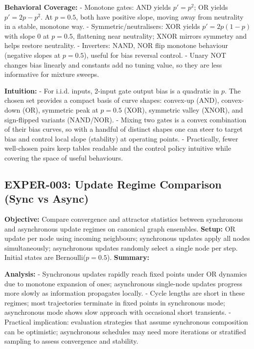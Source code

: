 \textbf{Behavioral Coverage:}
- Monotone gates: AND yields $p' = p^2$; OR yields $p' = 2p - p^2$. At $p=0.5$, both have positive slope, moving away from neutrality in a stable, monotone way.
- Symmetric/neutralisers: XOR yields $p' = 2p(1-p)$ with slope $0$ at $p=0.5$, flattening near neutrality; XNOR mirrors symmetry and helps restore neutrality.
- Inverters: NAND, NOR flip monotone behaviour (negative slopes at $p=0.5$), useful for bias reversal control.
- Unary NOT changes bias linearly and constants add no tuning value, so they are less informative for mixture sweeps.

\textbf{Intuition:}
- For i.i.d. inputs, 2-input gate output bias is a quadratic in $p$. The chosen set provides a compact basis of curve shapes: convex-up (AND), convex-down (OR), symmetric peak at $p=0.5$ (XOR), symmetric valley (XNOR), and sign-flipped variants (NAND/NOR).
- Mixing two gates is a convex combination of their bias curves, so with a handful of distinct shapes one can steer to target bias and control local slope (stability) at operating points.
- Practically, fewer well-chosen pairs keep tables readable and the control policy intuitive while covering the space of useful behaviours.




\subsection{EXPER-003: Update Regime Comparison (Sync vs Async)}
\textbf{Objective:} Compare convergence and attractor statistics between synchronous and asynchronous update regimes on canonical graph ensembles.
\textbf{Setup:} OR update per node using incoming neighbours; synchronous updates apply all nodes simultaneously; asynchronous updates randomly select a single node per step. Initial states are Bernoulli($p=0.5$).
\textbf{Summary:}
\begin{center}
\end{center}
\textbf{Analysis:}
- Synchronous updates rapidly reach fixed points under OR dynamics due to monotone expansion of ones; asynchronous single-node updates progress more slowly as information propagates locally.
- Cycle lengths are short in these regimes; most trajectories terminate in fixed points in synchronous mode; asynchronous mode shows slow approach with occasional short transients.
- Practical implication: evaluation strategies that assume synchronous composition can be optimistic; asynchronous schedules may need more iterations or stratified sampling to assess convergence and stability.



